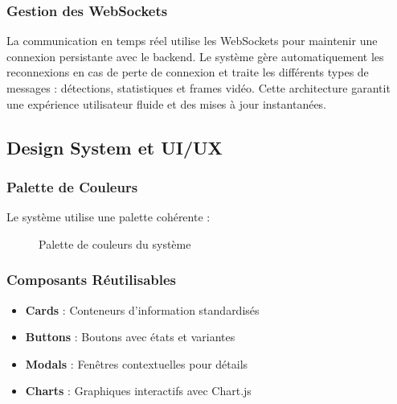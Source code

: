 \documentclass[12pt,a4paper]{article}
\begin{document}
\subsubsection{Gestion des WebSockets}
La communication en temps réel utilise les WebSockets pour maintenir une connexion persistante avec le backend. Le système gère automatiquement les reconnexions en cas de perte de connexion et traite les différents types de messages : détections, statistiques et frames vidéo. Cette architecture garantit une expérience utilisateur fluide et des mises à jour instantanées.

\subsection{Design System et UI/UX}

\subsubsection{Palette de Couleurs}
Le système utilise une palette cohérente :

\begin{figure}[H]
\centering
{}
\caption{Palette de couleurs du système}
\end{figure}

\subsubsection{Composants Réutilisables}
\begin{itemize}
    \item \textbf{Cards} : Conteneurs d'information standardisés
    \item \textbf{Buttons} : Boutons avec états et variantes
    \item \textbf{Modals} : Fenêtres contextuelles pour détails
    \item \textbf{Charts} : Graphiques interactifs avec Chart.js
\end{itemize}
\end{document}
